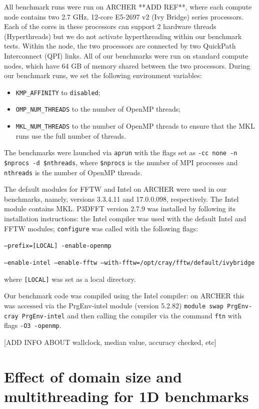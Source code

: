 \documentclass[a4paper]{article}
\begin{document}
All benchmark runs were run on ARCHER **ADD REF**, where each compute
node contains two 2.7 GHz, 12-core E5-2697 v2 (Ivy Bridge) series
processors. Each of the cores in these processors can support 2
hardware threads (Hyperthreads) but we do not activate hyperthreading
within our benchmark tests. Within the node, the two processors are
connected by two QuickPath Interconnect (QPI) links. All of our
benchmarks were run on standard compute nodes, which have 64 GB of
memory shared between the two processors. During our benchmark runs,
we set the following environment variables:
\begin{itemize}
\item \texttt{KMP\_AFFINITY} to \texttt{disabled};
\item \texttt{OMP\_NUM\_THREADS} to the number of OpenMP threads;
\item \texttt{MKL\_NUM\_THREADS} to the number of OpenMP threads to
  ensure that the MKL runs use the full number of threads.
\end{itemize}
The benchmarks were launched via \texttt{aprun} with the flags set as
\texttt{-cc none -n \$nprocs -d \$nthreads}, where \texttt{\$nprocs}
is the number of MPI processes and \texttt{nthreads} is the number of
OpenMP threads.

The default modules for FFTW and Intel on ARCHER were used in our
benchmarks, namely, versions 3.3.4.11 and 17.0.0.098,
respectively. The Intel module contains MKL.  P3DFFT version 2.7.9 was
installed by following its installation instructions: the Intel
compiler was used with the default Intel and FFTW modules;
\texttt{configure} was called with the following flags:

\noindent \texttt{--prefix=[LOCAL] -enable-openmp}

\noindent \texttt{--enable-intel --enable-fftw
  --with-fftw=/opt/cray/fftw/default/ivybridge}

\noindent where \texttt{[LOCAL]} was set as a local directory.

Our benchmark code was compiled using the Intel compiler: on ARCHER
this was accessed via the PrgEnv-intel module (version 5.2.82)
\noindent \texttt{module swap PrgEnv-cray PrgEnv-intel} and then
calling the compiler via the command \texttt{ftn} with flags
\texttt{-O3 -openmp}.



[ADD INFO ABOUT wallclock, median value, accuracy checked, etc]

\section{Effect of domain size and multithreading for 1D benchmarks}\label{Sec:1DMulti}
\end{document}
